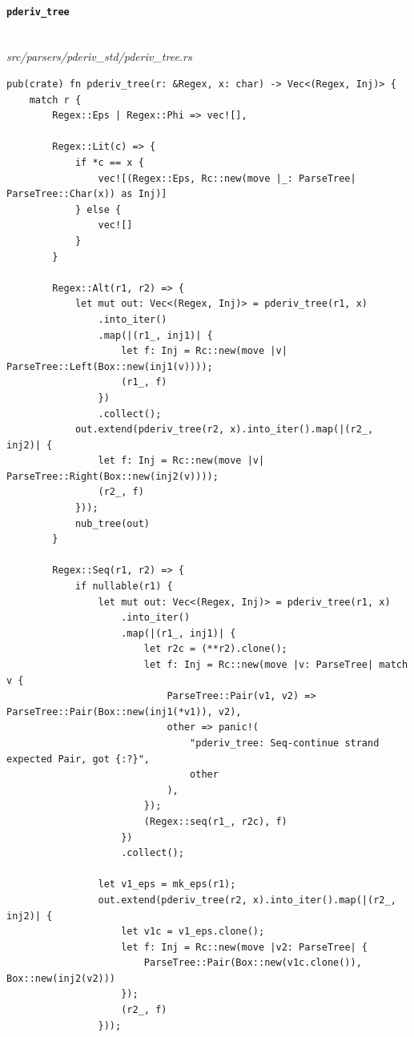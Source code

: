 \paragraph{\texttt{pderiv\_tree}}\ \\[-0.4em]
\textit{\small src/parsers/pderiv\_std/pderiv\_tree.rs}
{\scriptsize\begin{verbatim}
pub(crate) fn pderiv_tree(r: &Regex, x: char) -> Vec<(Regex, Inj)> {
    match r {
        Regex::Eps | Regex::Phi => vec![],

        Regex::Lit(c) => {
            if *c == x {
                vec![(Regex::Eps, Rc::new(move |_: ParseTree| ParseTree::Char(x)) as Inj)]
            } else {
                vec![]
            }
        }

        Regex::Alt(r1, r2) => {
            let mut out: Vec<(Regex, Inj)> = pderiv_tree(r1, x)
                .into_iter()
                .map(|(r1_, inj1)| {
                    let f: Inj = Rc::new(move |v| ParseTree::Left(Box::new(inj1(v))));
                    (r1_, f)
                })
                .collect();
            out.extend(pderiv_tree(r2, x).into_iter().map(|(r2_, inj2)| {
                let f: Inj = Rc::new(move |v| ParseTree::Right(Box::new(inj2(v))));
                (r2_, f)
            }));
            nub_tree(out)
        }

        Regex::Seq(r1, r2) => {
            if nullable(r1) {
                let mut out: Vec<(Regex, Inj)> = pderiv_tree(r1, x)
                    .into_iter()
                    .map(|(r1_, inj1)| {
                        let r2c = (**r2).clone();
                        let f: Inj = Rc::new(move |v: ParseTree| match v {
                            ParseTree::Pair(v1, v2) => ParseTree::Pair(Box::new(inj1(*v1)), v2),
                            other => panic!(
                                "pderiv_tree: Seq-continue strand expected Pair, got {:?}",
                                other
                            ),
                        });
                        (Regex::seq(r1_, r2c), f)
                    })
                    .collect();

                let v1_eps = mk_eps(r1);
                out.extend(pderiv_tree(r2, x).into_iter().map(|(r2_, inj2)| {
                    let v1c = v1_eps.clone();
                    let f: Inj = Rc::new(move |v2: ParseTree| {
                        ParseTree::Pair(Box::new(v1c.clone()), Box::new(inj2(v2)))
                    });
                    (r2_, f)
                }));


\end{verbatim}}
